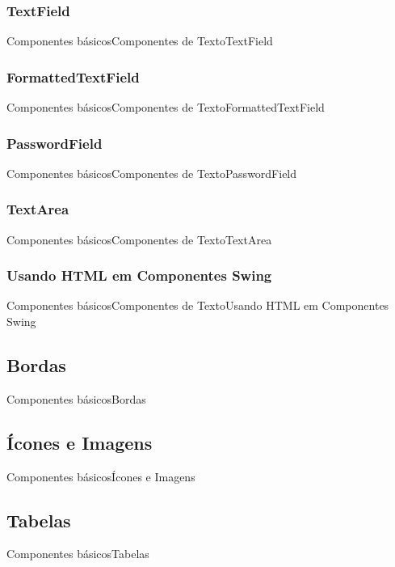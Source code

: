 \documentclass[10pt]{beamer}
\begin{document}
\subsubsection{TextField}
\begin{frame}{Componentes básicos}{Componentes de Texto}{TextField}
\end{frame}{}

\subsubsection{FormattedTextField}
\begin{frame}{Componentes básicos}{Componentes de Texto}{FormattedTextField}
\end{frame}{}

\subsubsection{PasswordField}
\begin{frame}{Componentes básicos}{Componentes de Texto}{PasswordField}
\end{frame}{}
\subsubsection{TextArea}
\begin{frame}{Componentes básicos}{Componentes de Texto}{TextArea}
\end{frame}{}
\subsubsection{Usando HTML em Componentes Swing}
\begin{frame}{Componentes básicos}{Componentes de Texto}{Usando HTML em Componentes Swing}
\end{frame}{}
\subsection{Bordas}
\begin{frame}{Componentes básicos}{Bordas}
\end{frame}{}
\subsection{Ícones e Imagens}
\begin{frame}{Componentes básicos}{Ícones e Imagens}
\end{frame}{}
\subsection{Tabelas}
\begin{frame}{Componentes básicos}{Tabelas}
\end{frame}{}
\end{document}
